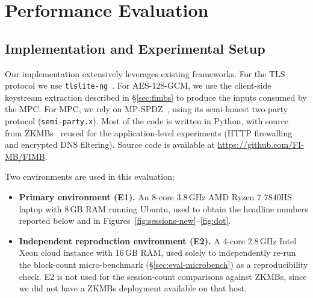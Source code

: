 %

\section{Performance Evaluation}
\label{sec:evaluation}

\subsection{Implementation and Experimental Setup}
\label{sec:eval-setup}

Our implementation extensively leverages existing frameworks. For the
TLS protocol we use \texttt{tlslite-ng}~\cite{tlslite-ng}. For
AES-128-GCM, we use the client-side keystream extraction described in
\S\ref{sec:fimbs} to produce the inputs consumed by the MPC. For MPC, we
rely on MP-SPDZ~\cite{Keller2020MPSPDZ}, using its semi-honest
two-party protocol (\texttt{semi-party.x}). Most of the code is written
in Python, with source from ZKMBs~\cite{Grubbs2022ZKMB} reused for the
application-level experiments (HTTP firewalling and encrypted DNS
filtering). Source code is available at
\url{https://github.com/FI-MB/FIMB}.

Two environments are used in this evaluation:

\begin{itemize}
  \item \textbf{Primary environment (E1).} An 8-core 3.8\,GHz AMD Ryzen
  7 7840HS laptop with 8\,GB RAM running Ubuntu, used to obtain the
  headline numbers reported below and in Figures~\ref{fig:sessions-new}--\ref{fig:dot}.
  \item \textbf{Independent reproduction environment (E2).} A 4-core
  2.8\,GHz Intel Xeon cloud instance with 16\,GB RAM, used solely to
  independently re-run the block-count micro-benchmark
  (\S\ref{sec:eval-microbench}) as a reproducibility check. E2 is not
  used for the session-count comparisons against ZKMBs, since we did
  not have a ZKMBs deployment available on that host.
\end{itemize}

